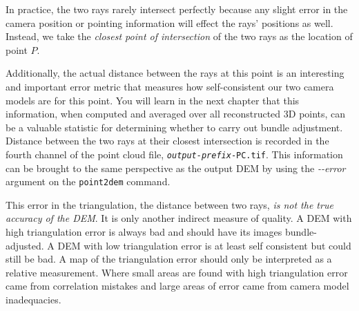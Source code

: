 In practice, the two rays rarely intersect perfectly because any
slight error in the camera position or pointing information will
effect the rays' positions as well.  Instead, we take the {\em closest
  point of intersection} of the two rays as the location of point
$P$.

Additionally, the actual distance between the rays at this point is an
interesting and important error metric that measures how
self-consistent our two camera models are for this point.  You will
learn in the next chapter that this information, when computed and
averaged over all reconstructed 3D points, can be a valuable statistic
for determining whether to carry out bundle adjustment. Distance
between the two rays at their closest intersection is recorded in the
fourth channel of the point cloud file,
\texttt{\textit{output-prefix}-PC.tif}. This information can be
brought to the same perspective as the output DEM by using the
\textit{-\/-error} argument on the \texttt{point2dem} command.

This error in the triangulation, the distance between two rays,
\emph{is not the true accuracy of the DEM}. It is only another
indirect measure of quality. A DEM with high triangulation error
is always bad and should have its images bundle-adjusted. A DEM
with low triangulation error is at least self consistent but could
still be bad. A map of the triangulation error should only be
interpreted as a relative measurement. Where small areas are found
with high triangulation error came from correlation mistakes and
large areas of error came from camera model inadequacies.
